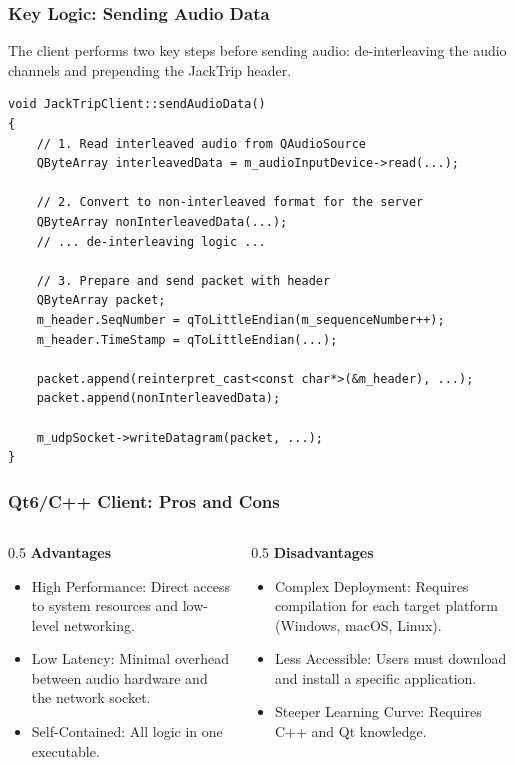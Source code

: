 \documentclass{beamer}
\begin{document}
\begin{frame}[fragile]
\frametitle{Key Logic: Sending Audio Data}
The client performs two key steps before sending audio: de-interleaving the audio channels and prepending the JackTrip header.
\begin{lstlisting}[language=myC++]
void JackTripClient::sendAudioData()
{
    // 1. Read interleaved audio from QAudioSource
    QByteArray interleavedData = m_audioInputDevice->read(...);

    // 2. Convert to non-interleaved format for the server
    QByteArray nonInterleavedData(...);
    // ... de-interleaving logic ...

    // 3. Prepare and send packet with header
    QByteArray packet;
    m_header.SeqNumber = qToLittleEndian(m_sequenceNumber++);
    m_header.TimeStamp = qToLittleEndian(...);

    packet.append(reinterpret_cast<const char*>(&m_header), ...);
    packet.append(nonInterleavedData);
    
    m_udpSocket->writeDatagram(packet, ...);
}
\end{lstlisting}
\end{frame}

\begin{frame}
\frametitle{Qt6/C++ Client: Pros and Cons}
\begin{columns}[T]
    \begin{column}{0.5\textwidth}
        \textbf{Advantages}
        \begin{itemize}
            \item \alert<1>{High Performance}: Direct access to system resources and low-level networking.
            \item \alert<1>{Low Latency}: Minimal overhead between audio hardware and the network socket.
            \item \alert<1>{Self-Contained}: All logic in one executable.
        \end{itemize}
    \end{column}
    \begin{column}{0.5\textwidth}
        \textbf{Disadvantages}
        \begin{itemize}
            \item \alert<2>{Complex Deployment}: Requires compilation for each target platform (Windows, macOS, Linux).
            \item \alert<2>{Less Accessible}: Users must download and install a specific application.
            \item \alert<2>{Steeper Learning Curve}: Requires C++ and Qt knowledge.
        \end{itemize}
    \end{column}
\end{columns}
\end{frame}
\end{document}
